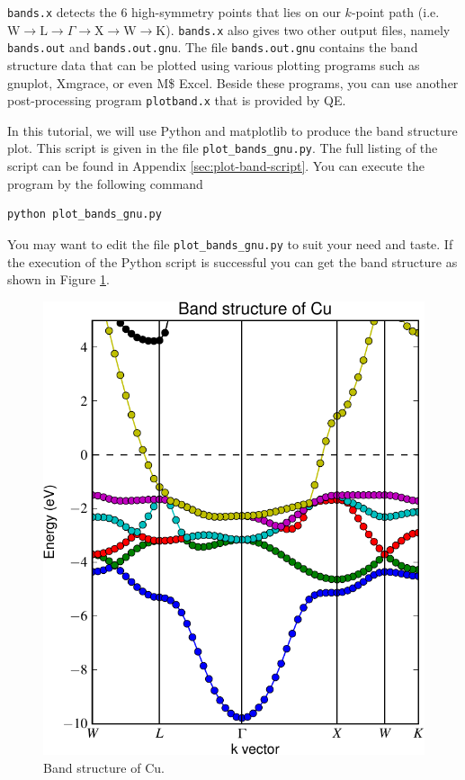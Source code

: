 \documentclass[12pt,english]{paper}
\begin{document}
\texttt{bands.x} detects the 6 high-symmetry points that lies on our
$k$-point path (i.e. $\mathrm{W}\rightarrow\mathrm{L}\rightarrow\Gamma\rightarrow\mathrm{X}\rightarrow\mathrm{W}\rightarrow\mathrm{K}$).
\texttt{bands.x} also gives two other output files, namely \texttt{bands.out}
and \texttt{bands.out.gnu}. The file \texttt{bands.out.gnu} contains
the band structure data that can be plotted using various plotting
programs such as gnuplot, Xmgrace, or even M\$ Excel. Beside these
programs, you can use another post-processing program \texttt{plotband.x}
that is provided by QE.

In this tutorial, we will use Python and matplotlib \cite{Hunter2007}
to produce the band structure plot. This script is given in the file
\texttt{plot\_bands\_gnu.py}. The full listing of the script can be
found in Appendix \ref{sec:plot-band-script}. You can execute the
program by the following command

\begin{lstlisting}
python plot_bands_gnu.py
\end{lstlisting}


You may want to edit the file \texttt{plot\_bands\_gnu.py} to suit
your need and taste. If the execution of the Python script is successful
you can get the band structure as shown in Figure \ref{fig:Cu-bands}.

\begin{figure}[H]
\noindent \begin{centering}
\includegraphics[scale=0.8]{images/Cu_bands_v1}
\par\end{centering}

\caption{Band structure of Cu. \label{fig:Cu-bands}}
\end{figure}
\end{document}

